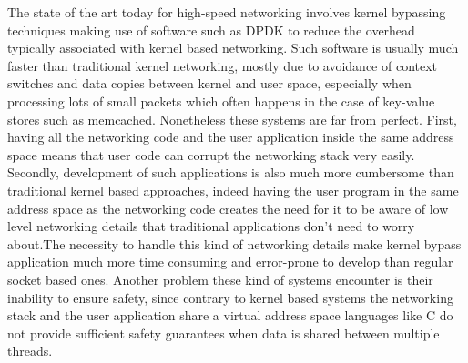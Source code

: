 The state of the art today for high-speed networking involves kernel
bypassing techniques making use of software such as DPDK to reduce the
overhead typically associated with kernel based networking. Such
software is usually much faster than traditional kernel networking,
mostly due to avoidance of context switches and data copies between
kernel and user space, especially when processing lots of small
packets which often happens in the case of key-value stores such as
memcached. Nonetheless these systems are far from perfect. First,
having all the  networking code and the user application inside the
same address space means that user code can corrupt the networking
stack very easily. Secondly, development of such applications is also
much more cumbersome than traditional kernel based approaches, indeed
having the user program in the same address space as the networking
code creates the need for it to be aware of low level networking
details that traditional applications don't need to worry about.The
necessity to handle this kind of networking details make kernel bypass
application much more time consuming and error-prone to develop than
regular socket based ones. Another problem these kind of systems
encounter is their inability to ensure safety, since contrary to
kernel based systems the networking stack and the user application
share a virtual address space languages like C do not provide
sufficient safety guarantees when data is shared between multiple
threads.


